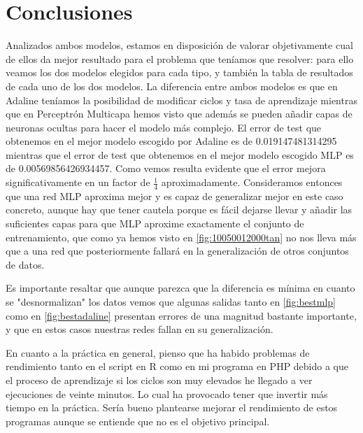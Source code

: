 \documentclass[11pt,spanish,listoffigures,listoftables]{workluis}
\begin{document}

\chapter{Conclusiones}

\par Analizados ambos modelos, estamos en disposición de valorar objetivamente cual de ellos da mejor resultado para el problema que teníamos que resolver: para ello veamos los dos modelos elegidos para cada tipo, y también la tabla de resultados de cada uno de los dos modelos. La diferencia entre ambos modelos es que en Adaline teníamos la posibilidad de modificar ciclos y tasa de aprendizaje mientras que en Perceptrón Multicapa hemos visto que además se pueden añadir capas de neuronas ocultas para hacer el modelo más complejo. El error de test que obtenemos en el mejor modelo escogido por Adaline es de 0.019147481314295 mientras que el error de test que obtenemos en el mejor modelo escogido MLP es de 0.00569856426934457. Como vemos resulta evidente que el error mejora significativamente en un factor de $\frac{1}{4}$ aproximadamente. Consideramos entonces que una red MLP aproxima mejor y es capaz de generalizar mejor en este caso concreto, aunque hay que tener cautela porque es fácil dejarse llevar y añadir las suficientes capas para que MLP aproxime exactamente el conjunto de entrenamiento, que como ya hemos visto en \ref{fig:10050012000tan} no nos lleva más que a una red que posteriormente fallará en la generalización de otros conjuntos de datos.

\par Es importante resaltar que aunque parezca que la diferencia es mínima en cuanto se "desnormalizan" los datos vemos que algunas salidas tanto en \ref{fig:bestmlp} como en \ref{fig:bestadaline} presentan errores de una magnitud bastante importante, y que en estos casos nuestras redes fallan en su generalización.

\par En cuanto a la práctica en general, pienso que ha habido problemas de rendimiento tanto en el script en R como en mi programa en PHP debido a que el proceso de aprendizaje si los ciclos son muy elevados he llegado a ver ejecuciones de veinte minutos. Lo cual ha provocado tener que invertir más tiempo en la práctica. Sería bueno plantearse mejorar el rendimiento de estos programas aunque se entiende que no es el objetivo principal.
\end{document}
